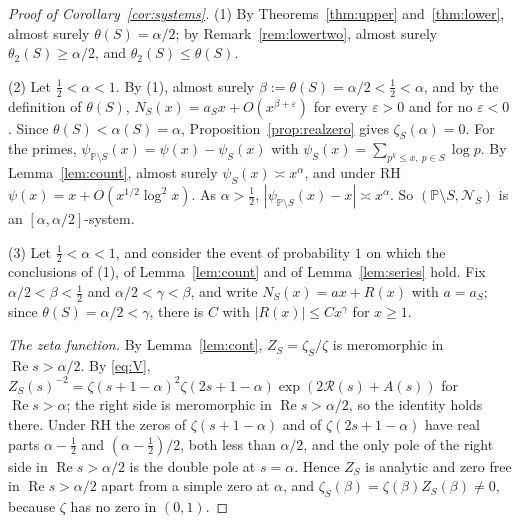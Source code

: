 \documentclass[11pt]{amsart}
\theoremstyle{remark}
\numberwithin{equation}{section}
\newcommand{\PP}{\mathbb{P}}
\newcommand{\cN}{\mathcal{N}}
\newcommand{\cR}{\mathcal{R}}
\newcommand{\eps}{\varepsilon}
\DeclareMathOperator{\re}{Re}
\begin{document}
\begin{proof}[Proof of Corollary~\ref{cor:systems}]
(1) By Theorems~\ref{thm:upper} and~\ref{thm:lower}, almost surely $\theta(S)=\alpha/2$; by Remark~\ref{rem:lowertwo}, almost surely $\theta_2(S)\ge\alpha/2$, and $\theta_2(S)\le\theta(S)$.

(2) Let $\tfrac12<\alpha<1$. By (1), almost surely $\beta:=\theta(S)=\alpha/2<\tfrac12<\alpha$, and by the definition of $\theta(S)$, $N_S(x)=a_Sx+O(x^{\beta+\eps})$ for every $\eps>0$ and for no $\eps<0$. Since $\theta(S)<\alpha(S)=\alpha$, Proposition~\ref{prop:realzero} gives $\zeta_S(\alpha)=0$. For the primes, $\psi_{\PP\setminus S}(x)=\psi(x)-\psi_S(x)$ with $\psi_S(x)=\sum_{p^k\le x,\ p\in S}\log p$. By Lemma~\ref{lem:count}, almost surely $\psi_S(x)\asymp x^{\alpha}$, and under RH $\psi(x)=x+O(x^{1/2}\log^2x)$. As $\alpha>\tfrac12$, $|\psi_{\PP\setminus S}(x)-x|\asymp x^{\alpha}$. So $(\PP\setminus S,\cN_S)$ is an $[\alpha,\alpha/2]$-system.

(3) Let $\tfrac12<\alpha<1$, and consider the event of probability $1$ on which the conclusions of (1), of Lemma~\ref{lem:count} and of Lemma~\ref{lem:series} hold. Fix $\alpha/2<\beta<\tfrac12$ and $\alpha/2<\gamma<\beta$, and write $N_S(x)=ax+R(x)$ with $a=a_S$; since $\theta(S)=\alpha/2<\gamma$, there is $C$ with $|R(x)|\le Cx^{\gamma}$ for $x\ge1$.

\emph{The zeta function.} By Lemma~\ref{lem:cont}, $Z_S=\zeta_S/\zeta$ is meromorphic in $\re s>\alpha/2$. By \eqref{eq:V}, $Z_S(s)^{-2}=\zeta(s+1-\alpha)^2\zeta(2s+1-\alpha)\exp(2\cR(s)+A(s))$ for $\re s>\alpha$; the right side is meromorphic in $\re s>\alpha/2$, so the identity holds there. Under RH the zeros of $\zeta(s+1-\alpha)$ and of $\zeta(2s+1-\alpha)$ have real parts $\alpha-\tfrac12$ and $(\alpha-\tfrac12)/2$, both less than $\alpha/2$, and the only pole of the right side in $\re s>\alpha/2$ is the double pole at $s=\alpha$. Hence $Z_S$ is analytic and zero free in $\re s>\alpha/2$ apart from a simple zero at $\alpha$, and $\zeta_S(\beta)=\zeta(\beta)Z_S(\beta)\ne0$, because $\zeta$ has no zero in $(0,1)$.


\end{proof}
\end{document}
